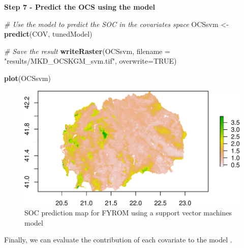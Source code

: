 \documentclass[10pt,b5paper,]{book}
\newenvironment{Shaded}{\begin{snugshade}}{\end{snugshade}}
\newcommand{\CommentTok}[1]{\textcolor[rgb]{0.56,0.35,0.01}{\textit{#1}}}
\newcommand{\ControlFlowTok}[1]{\textcolor[rgb]{0.13,0.29,0.53}{\textbf{#1}}}
\newcommand{\DataTypeTok}[1]{\textcolor[rgb]{0.13,0.29,0.53}{#1}}
\newcommand{\DecValTok}[1]{\textcolor[rgb]{0.00,0.00,0.81}{#1}}
\newcommand{\KeywordTok}[1]{\textcolor[rgb]{0.13,0.29,0.53}{\textbf{#1}}}
\newcommand{\NormalTok}[1]{#1}
\newcommand{\OperatorTok}[1]{\textcolor[rgb]{0.81,0.36,0.00}{\textbf{#1}}}
\newcommand{\OtherTok}[1]{\textcolor[rgb]{0.56,0.35,0.01}{#1}}
\newcommand{\StringTok}[1]{\textcolor[rgb]{0.31,0.60,0.02}{#1}}
\theoremstyle{definition}
\theoremstyle{definition}
\theoremstyle{definition}
\theoremstyle{remark}
\begin{document}
\textbf{Step 7 - Predict the OCS using the model}

\begin{Shaded}
\begin{Highlighting}[]
\CommentTok{# Use the model to predict the SOC in the covariates space}
\NormalTok{OCSsvm <-}\StringTok{ }\KeywordTok{predict}\NormalTok{(COV, tunedModel)}

\CommentTok{# Save the result}
\KeywordTok{writeRaster}\NormalTok{(OCSsvm, }\DataTypeTok{filename =} \StringTok{"results/MKD_OCSKGM_svm.tif"}\NormalTok{,}
            \DataTypeTok{overwrite=}\OtherTok{TRUE}\NormalTok{)}

\KeywordTok{plot}\NormalTok{(OCSsvm)}
\end{Highlighting}
\end{Shaded}

\begin{figure}
\centering
\includegraphics{SOCMapping_files/figure-latex/unnamed-chunk-79-1.pdf}
\caption{\label{fig:unnamed-chunk-79}SOC prediction map for FYROM using a
support vector machines model}
\end{figure}

Finally, we can evaluate the contribution of each covariate to the model
\citep{guyon2003introduction}.

\begin{Shaded}
\end{Shaded}
\end{document}
